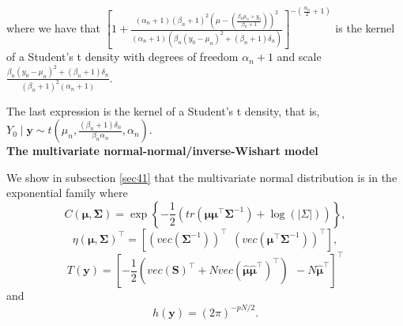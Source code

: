 \begin{enumerate}
where we have that $\left[1+\frac{(\alpha_n+1)(\beta_n+1)^2\left(\mu-\left(\frac{\beta_n\mu_n+y_0}{\beta_n+1}\right)\right)^2}{(\alpha_n+1)(\beta_n(y_0-\mu_n)^2+(\beta_n+1)\delta_n)}\right]^{-\left(\frac{\alpha_n}{2}+1\right)}$ is the kernel of a Student's t density with degrees of freedom $\alpha_n+1$ and scale $\frac{\beta_n(y_0-\mu_n)^2+(\beta_n+1)\delta_n}{(\beta_n+1)^2(\alpha_n+1)}$. 

The last expression is the kernel of a Student's t density, that is, $Y_0\mid \bm{y}\sim t\left(\mu_n,\frac{(\beta_n+1)\delta_n}{\beta_n\alpha_n},\alpha_n\right)$.\\

\textbf{The multivariate normal-normal/inverse-Wishart model}

We show in subsection \ref{sec41} that the multivariate normal distribution is in the exponential family where 
\begin{equation*}
C(\bm{\mu},\bm{\Sigma})=\exp\left\{-\frac{1}{2}\left(tr\left(\bm{\mu}\bm{\mu}^{\top}\bm{\Sigma}^{-1}\right)+\log(|\Sigma|)\right)\right\},
\end{equation*} 
\begin{equation*}
\eta(\bm{\mu},\bm{\Sigma})^{\top}=\left[\left(vec\left(\bm{\Sigma}^{-1}\right)\right)^{\top} \ \ \left(vec\left(\bm{\mu}^{\top}\bm{\Sigma}^{-1}\right)\right)^{\top}\right],
\end{equation*} 
\begin{equation*}
T(\bm{y})=\left[-\frac{1}{2}\left(vec\left(\bm{S}\right)^{\top}+N vec\left(\hat{\bm{\mu}}\hat{\bm{\mu}}^{\top}\right)^{\top}\right) \ \ -N\hat{\bm{\mu}}^{\top}\right]^{\top}
\end{equation*} and
\begin{equation*} 
h(\bm{y})=(2\pi)^{-pN/2}.
\end{equation*} 


\end{enumerate}
